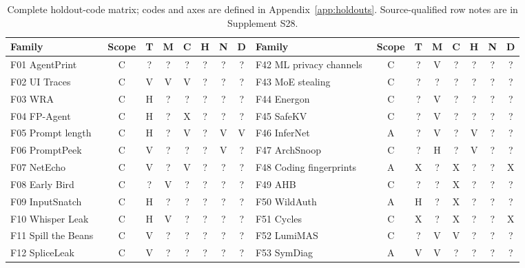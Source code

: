 \begin{table}[t]\centering\footnotesize
\caption{Complete holdout-code matrix; codes and axes are defined in Appendix~\ref{app:holdouts}. Source-qualified row notes are in Supplement S28.}\label{tab:r19-holdouts}
\setlength{\tabcolsep}{2.4pt}
\begin{tabularx}{\textwidth}{@{}Yccccccc@{\hspace{9pt}}Yccccccc@{}}\toprule
Family & Scope & T & M & C & H & N & D & Family & Scope & T & M & C & H & N & D\\\midrule
F01 AgentPrint~\cite{agentprint2025} & C & ? & ? & ? & ? & ? & ? & F42 ML privacy channels~\cite{debenedetti2024privacy} & C & ? & V & ? & ? & ? & ?\\
F02 UI Traces~\cite{uitraces2026} & C & V & V & V & ? & ? & ? & F43 MoE stealing~\cite{yona2024stealing} & C & ? & ? & ? & ? & ? & ?\\
F03 WRA~\cite{jeong2026wra} & C & H & ? & ? & ? & ? & ? & F44 Energon~\cite{chaudhuri2025energon} & C & ? & V & ? & ? & ? & ?\\
F04 FP-Agent~\cite{wang2026fpagent} & C & H & ? & X & ? & ? & ? & F45 SafeKV~\cite{chu2025safekv} & C & ? & V & ? & ? & ? & ?\\
F05 Prompt length~\cite{weiss2024prompt} & C & H & ? & V & ? & V & V & F46 InferNet~\cite{anwar2026infernet} & A & ? & V & ? & V & ? & ?\\
F06 PromptPeek~\cite{promptpeek2025} & C & V & ? & ? & ? & V & ? & F47 ArchSnoop~\cite{weng2026archsnoop} & C & ? & H & ? & V & ? & ?\\
F07 NetEcho~\cite{netecho2025} & C & V & ? & V & ? & ? & ? & F48 Coding fingerprints~\cite{ghaleb2026codingfingerprint} & A & X & ? & X & ? & ? & X\\
F08 Early Bird~\cite{earlybird2025} & C & ? & V & ? & ? & ? & ? & F49 AHB~\cite{zhu2026turing} & C & ? & ? & X & ? & ? & ?\\
F09 InputSnatch~\cite{inputsnatch2024} & C & H & ? & ? & ? & ? & ? & F50 WildAuth~\cite{wang2026dialogue} & A & H & ? & X & ? & ? & ?\\
F10 Whisper Leak~\cite{whisperleak2025} & C & H & V & ? & ? & ? & ? & F51 Cycles~\cite{george2025cycles} & C & X & ? & X & ? & ? & X\\
F11 Spill the Beans~\cite{spillbeans2025} & C & V & ? & ? & ? & ? & ? & F52 LumiMAS~\cite{solomon2026lumimas} & C & ? & V & V & ? & ? & ?\\
F12 SpliceLeak~\cite{spliceleak2026} & C & V & ? & ? & ? & ? & ? & F53 SymDiag~\cite{cui2026symdiag} & A & V & V & ? & ? & ? & ?\\

\end{tabularx}
\end{table}
